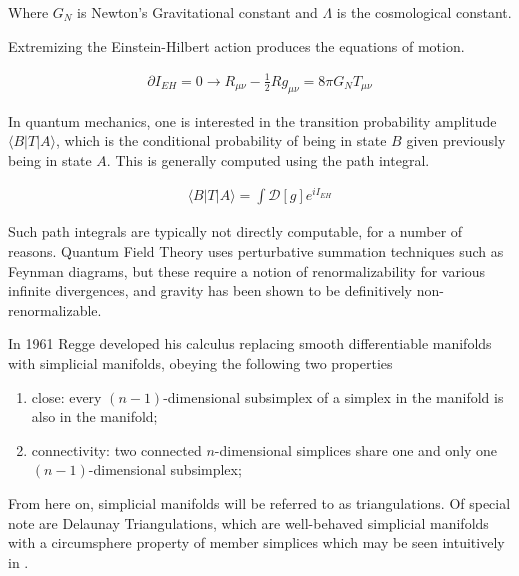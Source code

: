 \documentclass[12pt]{article}
\begin{document}
Where $G_{N}$ is Newton's Gravitational constant and $\Lambda$ is the cosmological constant.

Extremizing the Einstein-Hilbert action produces the equations of motion.

\begin{align}
  \partial I_{EH} = 0 \rightarrow R_{\mu\nu}-\frac{1}{2}Rg_{\mu\nu}=8\pi G_{N}T_{\mu\nu}
\end{align}

In quantum mechanics, one is interested in the transition probability amplitude $\langle B|T|A\rangle$, which is the conditional probability of being in state $B$ given previously being in state $A$. This is generally computed using the path integral.

\begin{align}
  \langle B|T|A\rangle=\int\mathcal{D}[g]e^{iI_{EH}}
\end{align}

Such path integrals are typically not directly computable, for a number of reasons. Quantum Field Theory uses perturbative summation techniques such as Feynman diagrams, but these require a notion of renormalizability for various infinite divergences, and gravity has been shown to be definitively non-renormalizable.\cite{shomer_pedagogical_2007}

In 1961 Regge developed his calculus replacing smooth differentiable manifolds with simplicial manifolds, obeying the following two properties\\[-4ex]
\begin{enumerate}\addtolength{\itemsep}{-1.5ex}
\item close: every $(n-1)$-dimensional subsimplex of a simplex in the manifold is also in the manifold;  
\item connectivity: two connected $n$-dimensional simplices share one and only one $(n-1)$-dimensional subsimplex;
\end{enumerate}
\vspace*{-1ex}

From here on, simplicial manifolds will be referred to as triangulations. Of special note are Delaunay Triangulations, which are well-behaved simplicial manifolds
with a circumsphere property of member simplices which may be seen intuitively in .
\end{document}
